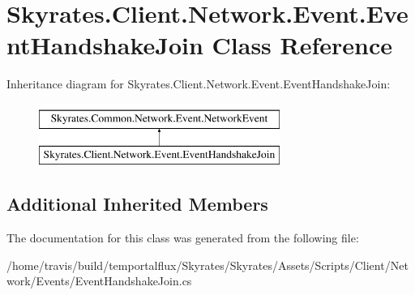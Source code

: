 \hypertarget{class_skyrates_1_1_client_1_1_network_1_1_event_1_1_event_handshake_join}{\section{Skyrates.\-Client.\-Network.\-Event.\-Event\-Handshake\-Join Class Reference}
\label{class_skyrates_1_1_client_1_1_network_1_1_event_1_1_event_handshake_join}
}
Inheritance diagram for Skyrates.\-Client.\-Network.\-Event.\-Event\-Handshake\-Join\-:\begin{figure}[H]
\begin{center}
\leavevmode
\includegraphics[height=2.000000cm]{class_skyrates_1_1_client_1_1_network_1_1_event_1_1_event_handshake_join}
\end{center}
\end{figure}
\subsection*{Additional Inherited Members}


The documentation for this class was generated from the following file\-:\begin{DoxyCompactItemize}
\item 
/home/travis/build/temportalflux/\-Skyrates/\-Skyrates/\-Assets/\-Scripts/\-Client/\-Network/\-Events/Event\-Handshake\-Join.\-cs\end{DoxyCompactItemize}
